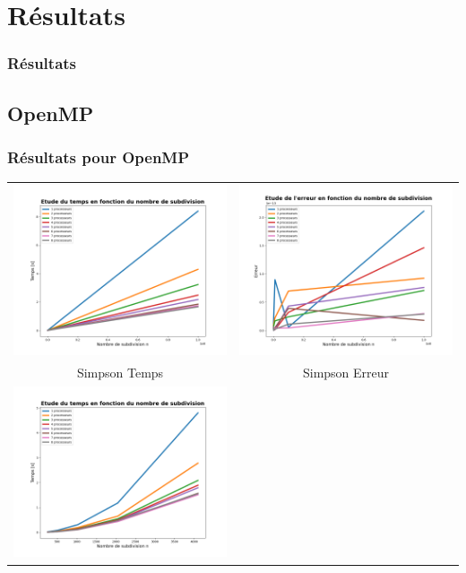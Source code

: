 \documentclass[10pt]{beamer}
\begin{document}
\section{Résultats}

\begin{frame}
    \frametitle{Résultats}
    \tableofcontents[currentsection]
\end{frame}

\subsection{OpenMP}

\begin{frame}
    \frametitle{Résultats pour OpenMP}
        \small
    \begin{tabular}{cc}
        \includegraphics[width=0.45\linewidth]{Images/time_simp_Op_MP.png} &
        \includegraphics[width=0.45\linewidth]{Images/error_simp_Op_MP.png} \\
        Simpson Temps & Simpson Erreur \\
        \includegraphics[width=0.45\linewidth]{Images/time_gauss_Op_MP.png} &

\end{tabular}
\end{frame}
\end{document}
